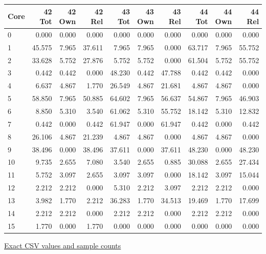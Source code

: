 \begin{center}{\scriptsize\setlength{\tabcolsep}{3pt}
\begin{tabular}{lrrrrrrrrr}
\toprule
Core & 42 Tot & 42 Own & 42 Rel & 43 Tot & 43 Own & 43 Rel & 44 Tot & 44 Own & 44 Rel \\
\midrule
0 & 0.000 & 0.000 & 0.000 & 0.000 & 0.000 & 0.000 & 0.000 & 0.000 & 0.000 \\
1 & 45.575 & 7.965 & 37.611 & 7.965 & 7.965 & 0.000 & 63.717 & 7.965 & 55.752 \\
2 & 33.628 & 5.752 & 27.876 & 5.752 & 5.752 & 0.000 & 61.504 & 5.752 & 55.752 \\
3 & 0.442 & 0.442 & 0.000 & 48.230 & 0.442 & 47.788 & 0.442 & 0.442 & 0.000 \\
4 & 6.637 & 4.867 & 1.770 & 26.549 & 4.867 & 21.681 & 4.867 & 4.867 & 0.000 \\
5 & 58.850 & 7.965 & 50.885 & 64.602 & 7.965 & 56.637 & 54.867 & 7.965 & 46.903 \\
6 & 8.850 & 5.310 & 3.540 & 61.062 & 5.310 & 55.752 & 18.142 & 5.310 & 12.832 \\
7 & 0.442 & 0.000 & 0.442 & 61.947 & 0.000 & 61.947 & 0.442 & 0.000 & 0.442 \\
8 & 26.106 & 4.867 & 21.239 & 4.867 & 4.867 & 0.000 & 4.867 & 4.867 & 0.000 \\
9 & 38.496 & 0.000 & 38.496 & 37.611 & 0.000 & 37.611 & 48.230 & 0.000 & 48.230 \\
10 & 9.735 & 2.655 & 7.080 & 3.540 & 2.655 & 0.885 & 30.088 & 2.655 & 27.434 \\
11 & 5.752 & 3.097 & 2.655 & 3.097 & 3.097 & 0.000 & 18.142 & 3.097 & 15.044 \\
12 & 2.212 & 2.212 & 0.000 & 5.310 & 2.212 & 3.097 & 2.212 & 2.212 & 0.000 \\
13 & 3.982 & 1.770 & 2.212 & 36.283 & 1.770 & 34.513 & 19.469 & 1.770 & 17.699 \\
14 & 2.212 & 2.212 & 0.000 & 2.212 & 2.212 & 0.000 & 2.212 & 2.212 & 0.000 \\
15 & 1.770 & 0.000 & 1.770 & 0.000 & 0.000 & 0.000 & 0.000 & 0.000 & 0.000 \\
\bottomrule\end{tabular}}
{\footnotesize\href{https://github.com/sanjeevkrishnaa/Compiler-Driven-ACE/blob/codex/ace-scheduler-correctness/docs/latex/qft96_final/data/heatmap_mesh_max_reliability_route_m3.csv}{Exact CSV values and sample counts}}
\end{center}
